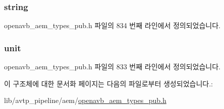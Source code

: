 \subsubsection[{\texorpdfstring{string}{string}}]{ string}\hypertarget{structopenavb__aem__control__value__format__control__linear__int64__t_a1f81001cefa769cb3651172fd5ab0748}{}\label{structopenavb__aem__control__value__format__control__linear__int64__t_a1f81001cefa769cb3651172fd5ab0748}


openavb\+\_\+aem\+\_\+types\+\_\+pub.\+h 파일의 834 번째 라인에서 정의되었습니다.

\subsubsection[{\texorpdfstring{unit}{unit}}]{ unit}\hypertarget{structopenavb__aem__control__value__format__control__linear__int64__t_a0b3ff376c10369016824076deacc055e}{}\label{structopenavb__aem__control__value__format__control__linear__int64__t_a0b3ff376c10369016824076deacc055e}


openavb\+\_\+aem\+\_\+types\+\_\+pub.\+h 파일의 833 번째 라인에서 정의되었습니다.



이 구조체에 대한 문서화 페이지는 다음의 파일로부터 생성되었습니다.\+:\begin{DoxyCompactItemize}
\item 
lib/avtp\+\_\+pipeline/aem/\hyperlink{openavb__aem__types__pub_8h}{openavb\+\_\+aem\+\_\+types\+\_\+pub.\+h}\end{DoxyCompactItemize}
